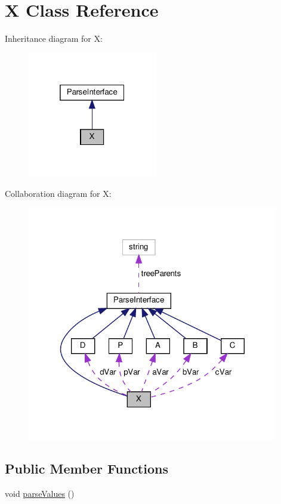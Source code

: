 \hypertarget{classX}{}\section{X Class Reference}
\label{classX}


Inheritance diagram for X\+:
\nopagebreak
\begin{figure}[H]
\begin{center}
\leavevmode
\includegraphics[width=160pt]{classX__inherit__graph}
\end{center}
\end{figure}


Collaboration diagram for X\+:
\nopagebreak
\begin{figure}[H]
\begin{center}
\leavevmode
\includegraphics[width=311pt]{classX__coll__graph}
\end{center}
\end{figure}
\subsection*{Public Member Functions}
\begin{DoxyCompactItemize}
\item 
void \hyperlink{classX_a0d0aabf7efbe8356894613e58b736216}{parse\+Values} ()
\end{DoxyCompactItemize}
